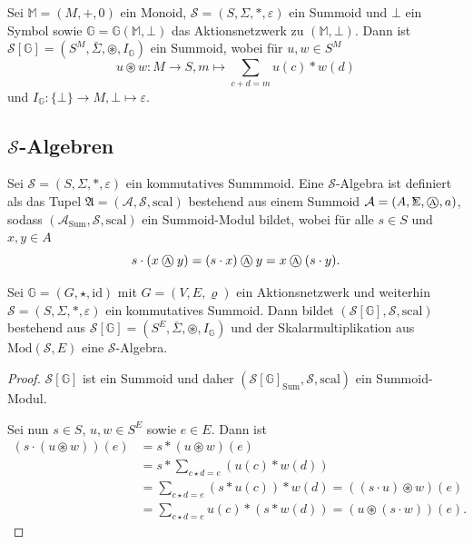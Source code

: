 \documentclass{article}
\DeclareMathOperator*{\Sigmacirc}{%
  \ThisStyle{\mathop{\ensurestackMath{\stackinset{c}{-0.75\LMpt}{c}{}{%
  \rotatebox[origin=lb]{-90}{$\circ$}}{\SavedStyle\Sigma}}}}}
\newcommand{\algebra}{\mathbin{
  \mathchoice
    {\mbox{\normalsize\textcircled{\scriptsize A}}}
    {\mbox{\normalsize\textcircled{\scriptsize A}}}
    {\mbox{\scriptsize\textcircled{\tiny A}}}
    {\mbox{\tiny\textcircled{\fontsize{3.5}{3.5}\selectfont A}}}
  }
}
\begin{document}
\begin{example}
  Sei $\mathbb{M} = (M, +, 0)$ ein Monoid,
  $\mathcal{S} = (S, \Sigma, \ast , \varepsilon)$ ein Summoid
  und $\bot$ ein Symbol
  sowie $\mathbb{G} = \mathbb{G}(\mathbb{M}, \bot)$ das Aktionsnetzwerk zu $(\mathbb{M}, \bot)$.
  Dann ist $\mathcal{S}[\mathbb{G}] = (S^M, \bar\Sigma, \circledast, I_\mathbb{G})$ ein Summoid,
  wobei für $u, w \in S^M$
  \begin{equation*}
    u \circledast w \colon M \to S, m \mapsto \sum_{c + d = m} u(c) \ast w(d)
  \end{equation*}
  und $I_\mathbb{G} \colon \{\bot\} \to M, \bot \mapsto \varepsilon$.
\end{example}

\subsection{$\mathcal{S}$-Algebren}

\begin{definition}
  Sei $\mathcal{S} = (S, \Sigma, \ast, \varepsilon)$ ein kommutatives Summmoid.
  Eine $\mathcal{S}$-Algebra ist definiert als das Tupel $\mathfrak{A} = (\mathcal{A}, \mathcal{S}, \text{scal})$
  bestehend aus einem Summoid $\mathcal{A} = (A, \Sigmacirc, \algebra, a)$,
  sodass $(\mathcal{A}_\text{Sum}, \mathcal{S}, \text{scal})$ ein Summoid-Modul bildet,
  wobei für alle $s \in S$ und $x, y \in A$
  \begin{equation*}
    s \cdot (x \algebra y) = (s \cdot x) \algebra y = x \algebra (s \cdot y).
  \end{equation*}
\end{definition}

\begin{theorem}
  Sei $\mathbb{G} = (G, \star, \text{id})$ mit $G = (V, E, \varrho)$ ein Aktionsnetzwerk
  und weiterhin $\mathcal{S} = (S, \Sigma, \ast, \varepsilon)$ ein kommutatives Summoid.
  Dann bildet $(\mathcal{S}[\mathbb{G}], \mathcal{S}, \text{scal})$
  bestehend aus $\mathcal{S}[\mathbb{G}] = (S^E, \bar\Sigma, \circledast, I_\mathbb{G})$
  und der Skalarmultiplikation aus $\text{Mod}(\mathcal{S}, E)$
  eine $\mathcal{S}$-Algebra.
\end{theorem}
\begin{proof}
  $\mathcal{S}[\mathbb{G}]$ ist ein Summoid
  und daher $(\mathcal{S}[\mathbb{G}]_\text{Sum}, \mathcal{S}, \text{scal})$ ein Summoid-Modul.

  Sei nun $s \in S$, $u, w \in S^E$ sowie $e \in E$.
  Dann ist
  \begin{align*}
    (s \cdot (u \circledast w))(e)
    &= s \ast (u \circledast w)(e) \\
    &= s \ast \sum_{c \star d = e} (u(c) \ast w(d)) \\
    &= \sum_{c \star d = e} (s \ast u(c)) \ast w(d) = ((s \cdot u) \circledast w)(e) \\
    &= \sum_{c \star d = e} u(c) \ast (s \ast w(d)) = (u \circledast (s \cdot w))(e).
  \end{align*}
\end{proof}
\end{document}
